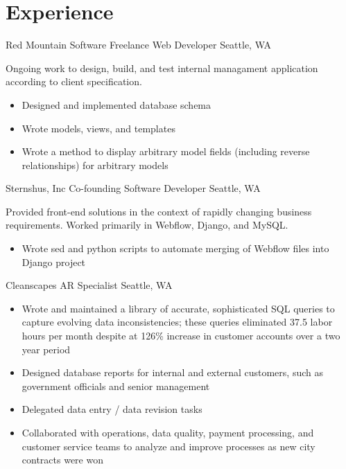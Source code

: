 \documentclass[10pt,a4paper,sans]{moderncv}        %
\begin{document}
\section{Experience}

\begin{comment}
  \cventry
  {date - date}
  {Employer}
  {Job Title}
  {}
  {City, State}
  {Description of work
    \begin{itemize}
    \item specific achievement
    \item specific achievement
    \end{itemize}}
\end{comment}

 {Red Mountain Software} {Freelance Web Developer}
{} {Seattle, WA} {Ongoing work to design, build, and test internal managament
  application according to client specification.
  \begin{itemize}
  \item Designed and implemented database schema
  \item Wrote models, views, and templates
  \item Wrote a method to display arbitrary model fields (including reverse
    relationships) for arbitrary models
  \end{itemize}}

 {Sternshus, Inc} {Co-founding Software Developer}
{} {Seattle, WA} {Provided front-end solutions in the context of rapidly
  changing business requirements. Worked primarily in Webflow, Django, and
  MySQL.
  \begin{itemize}
  \item Wrote sed and python scripts to automate merging of Webflow files
    into Django project
  \end{itemize}}

 {Cleanscapes} {AR Specialist} {} {Seattle, WA} {
  \begin{itemize}
  \item Wrote and maintained a library of accurate, sophisticated SQL queries
    to capture evolving data inconsistencies; these queries eliminated 37.5
    labor hours per month despite at 126\% increase in customer accounts over
    a two year period
  \item Designed database reports for internal and external customers, such as
    government officials and senior management
  \item Delegated data entry / data revision tasks
  \item Collaborated with operations, data quality, payment processing, and
    customer service teams to analyze and improve processes as new city
    contracts were won
  \end{itemize}}
\end{document}
